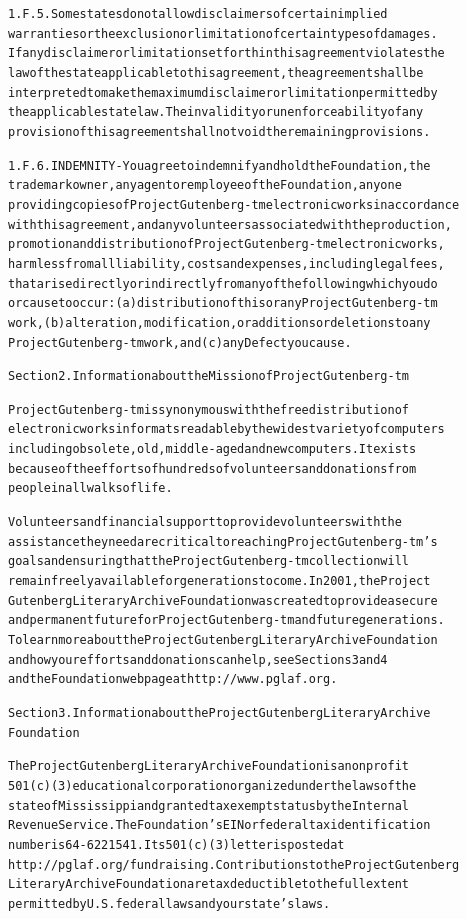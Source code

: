 \documentclass[12pt]{book}[2005/09/16]
\newenvironment{PGtext}{%
\begin{alltt}
\fontsize{8.1}{10}\ttfamily\selectfont}%
{\end{alltt}}
\renewcommand{\(}{{\upshape(}}
\renewcommand{\)}{{\upshape)}}
\begin{document}
\begin{PGtext}
1.F.5.  Some states do not allow disclaimers of certain implied
warranties or the exclusion or limitation of certain types of damages.
If any disclaimer or limitation set forth in this agreement violates the
law of the state applicable to this agreement, the agreement shall be
interpreted to make the maximum disclaimer or limitation permitted by
the applicable state law.  The invalidity or unenforceability of any
provision of this agreement shall not void the remaining provisions.

1.F.6.  INDEMNITY - You agree to indemnify and hold the Foundation, the
trademark owner, any agent or employee of the Foundation, anyone
providing copies of Project Gutenberg-tm electronic works in accordance
with this agreement, and any volunteers associated with the production,
promotion and distribution of Project Gutenberg-tm electronic works,
harmless from all liability, costs and expenses, including legal fees,
that arise directly or indirectly from any of the following which you do
or cause to occur: (a) distribution of this or any Project Gutenberg-tm
work, (b) alteration, modification, or additions or deletions to any
Project Gutenberg-tm work, and (c) any Defect you cause.


Section  2.  Information about the Mission of Project Gutenberg-tm

Project Gutenberg-tm is synonymous with the free distribution of
electronic works in formats readable by the widest variety of computers
including obsolete, old, middle-aged and new computers.  It exists
because of the efforts of hundreds of volunteers and donations from
people in all walks of life.

Volunteers and financial support to provide volunteers with the
assistance they need are critical to reaching Project Gutenberg-tm's
goals and ensuring that the Project Gutenberg-tm collection will
remain freely available for generations to come.  In 2001, the Project
Gutenberg Literary Archive Foundation was created to provide a secure
and permanent future for Project Gutenberg-tm and future generations.
To learn more about the Project Gutenberg Literary Archive Foundation
and how your efforts and donations can help, see Sections 3 and 4
and the Foundation web page at http://www.pglaf.org.


Section 3.  Information about the Project Gutenberg Literary Archive
Foundation

The Project Gutenberg Literary Archive Foundation is a non profit
501(c)(3) educational corporation organized under the laws of the
state of Mississippi and granted tax exempt status by the Internal
Revenue Service.  The Foundation's EIN or federal tax identification
number is 64-6221541.  Its 501(c)(3) letter is posted at
http://pglaf.org/fundraising.  Contributions to the Project Gutenberg
Literary Archive Foundation are tax deductible to the full extent
permitted by U.S. federal laws and your state's laws.


\end{PGtext}
\end{document}
